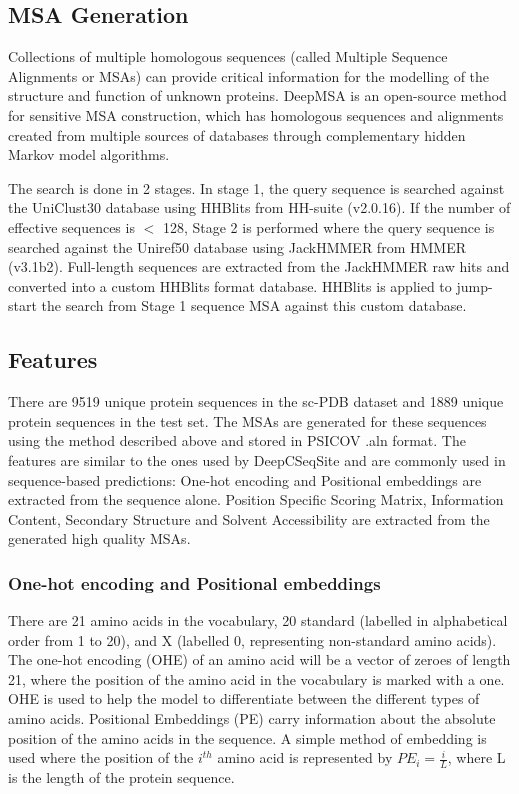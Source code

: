 \documentclass[journal=jacsat,manuscript=article]{achemso}
\begin{document}
\subsection{MSA Generation}
\quad Collections of multiple homologous sequences (called Multiple Sequence Alignments or MSAs) can provide critical information for the modelling of the structure and function of unknown proteins. DeepMSA \cite{zhang2020deepmsa} is an open-source method for sensitive MSA construction, which has homologous sequences and alignments created from multiple sources of databases through complementary hidden Markov model algorithms.

The search is done in 2 stages. In stage 1, the query sequence is searched against the UniClust30 \cite{mirdita2017uniclust} database using HHBlits from HH-suite\cite{remmert2012hhblits} (v2.0.16). If the number of effective sequences is $<$ 128, Stage 2 is performed where the query sequence is searched against the Uniref50 \cite{suzek2015uniref} database using JackHMMER from HMMER \cite{johnson2010hidden} (v3.1b2). Full-length sequences are extracted from the JackHMMER raw hits and converted into a custom HHBlits format database. HHBlits is applied to jump-start the search from Stage 1 sequence MSA against this custom database.


\subsection{Features}
\quad There are 9519 unique protein sequences in the sc-PDB dataset and 1889 unique protein sequences in the test set. The MSAs are generated for these sequences using the method described above and stored in PSICOV \cite{jones2012psicov} .aln format. The features are similar to the ones used by DeepCSeqSite\cite{cui2019predicting} and are commonly used in sequence-based predictions: One-hot encoding and Positional embeddings are extracted from the sequence alone. Position Specific Scoring Matrix, Information Content, Secondary Structure and Solvent Accessibility are extracted from the generated high quality MSAs.

\subsubsection{One-hot encoding and Positional embeddings}
\quad There are 21 amino acids in the vocabulary, 20 standard (labelled in alphabetical order from 1 to 20), and X (labelled 0, representing non-standard amino acids). The one-hot encoding (OHE) of an amino acid will be a vector of zeroes of length 21, where the position of the amino acid in the vocabulary is marked with a one. OHE is used to help the model to differentiate between the different types of amino acids. Positional Embeddings (PE) carry information about the absolute position of the amino acids in the sequence. A simple method of embedding is used where the position of the $i^{th}$ amino acid is represented by ${PE}_{i} = \frac{i}{L}$, where L is the length of the protein sequence.
\end{document}
